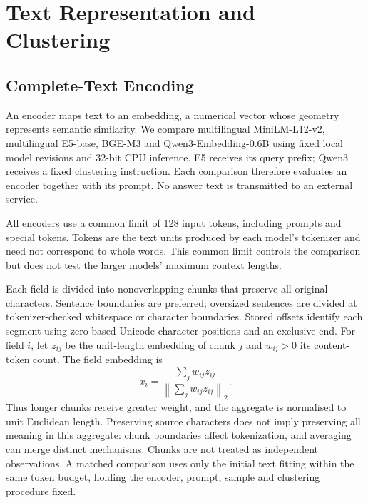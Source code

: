 \documentclass[12pt]{article}
\begin{document}
\section{Text Representation and Clustering}
\subsection{Complete-Text Encoding}
An encoder maps text to an embedding, a numerical vector whose geometry represents semantic similarity. We compare multilingual MiniLM-L12-v2, multilingual E5-base, BGE-M3 and Qwen3-Embedding-0.6B using fixed local model revisions and 32-bit CPU inference. E5 receives its query prefix; Qwen3 receives a fixed clustering instruction. Each comparison therefore evaluates an encoder together with its prompt. No answer text is transmitted to an external service.

All encoders use a common limit of 128 input tokens, including prompts and special tokens. Tokens are the text units produced by each model's tokenizer and need not correspond to whole words. This common limit controls the comparison but does not test the larger models' maximum context lengths.

Each field is divided into nonoverlapping chunks that preserve all original characters. Sentence boundaries are preferred; oversized sentences are divided at tokenizer-checked whitespace or character boundaries. Stored offsets identify each segment using zero-based Unicode character positions and an exclusive end. For field $i$, let $z_{ij}$ be the unit-length embedding of chunk $j$ and $w_{ij}>0$ its content-token count. The field embedding is
\begin{equation}
x_i=\frac{\sum_j w_{ij}z_{ij}}{\left\|\sum_j w_{ij}z_{ij}\right\|_2}.
\label{eq:field_embedding}
\end{equation}
Thus longer chunks receive greater weight, and the aggregate is normalised to unit Euclidean length. Preserving source characters does not imply preserving all meaning in this aggregate: chunk boundaries affect tokenization, and averaging can merge distinct mechanisms. Chunks are not treated as independent observations. A matched comparison uses only the initial text fitting within the same token budget, holding the encoder, prompt, sample and clustering procedure fixed.
\end{document}
